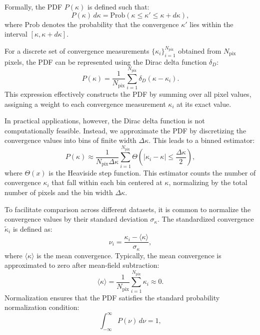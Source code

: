Formally, the PDF \( P(\kappa) \) is defined such that:
\begin{equation}
    P(\kappa) \, d\kappa = \mathrm{Prob}(\kappa \leq \kappa' \leq \kappa + d\kappa),
\end{equation}
where \(\mathrm{Prob}\) denotes the probability that the convergence \(\kappa'\) lies within the interval \([\kappa, \kappa + d\kappa]\).

For a discrete set of convergence measurements \(\{\kappa_i\}_{i=1}^{N_{\mathrm{pix}}}\) obtained from \(N_{\mathrm{pix}}\) pixels, the PDF can be represented using the Dirac delta function \(\delta_D\):
\begin{equation}
    P(\kappa) = \frac{1}{N_{\mathrm{pix}}} \sum_{i=1}^{N_{\mathrm{pix}}} \delta_D(\kappa - \kappa_i).
    \label{eq:pdf_delta}
\end{equation}
This expression effectively constructs the PDF by summing over all pixel values, assigning a weight to each convergence measurement \(\kappa_i\) at its exact value.

In practical applications, however, the Dirac delta function is not computationally feasible. Instead, we approximate the PDF by discretizing the convergence values into bins of finite width \(\Delta\kappa\). This leads to a binned estimator:
\begin{equation}
    P(\kappa) \approx \frac{1}{N_{\mathrm{pix}} \Delta\kappa} \sum_{i=1}^{N_{\mathrm{pix}}} \Theta\left(\left|\kappa_i - \kappa\right| \leq \frac{\Delta\kappa}{2}\right),
    \label{eq:pdf_binned}
\end{equation}
where \(\Theta(x)\) is the Heaviside step function. This estimator counts the number of convergence \(\kappa_i\) that fall within each bin centered at \(\kappa\), normalizing by the total number of pixels and the bin width \(\Delta\kappa\).

To facilitate comparison across different datasets, it is common to normalize the convergence values by their standard deviation $\sigma_\kappa$. The standardized convergence $\tilde{\kappa}_i$ is defined as:
\begin{equation}
    \nu_i = \frac{\kappa_i - \langle \kappa \rangle}{\sigma_\kappa},
    \label{eq:kappa_normalized}
\end{equation}
where $\langle \kappa \rangle$ is the mean convergence. Typically, the mean convergence is approximated to zero after mean-field subtraction:
\begin{equation}
    \langle \kappa \rangle = \frac{1}{N_{\mathrm{pix}}} \sum_{i=1}^{N_{\mathrm{pix}}} \kappa_i \approx 0.
\end{equation}
Normalization ensures that the PDF satisfies the standard probability normalization condition:
\begin{equation}
    \int_{-\infty}^{\infty} P(\nu) \, d\nu = 1,
    \label{eq:pdf_normalization}
\end{equation}


